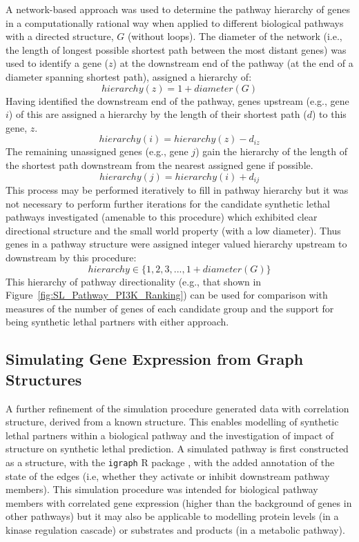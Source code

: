 A network-based approach was used to determine the pathway hierarchy of genes in a computationally rational way when applied to different biological pathways with a directed  structure, $G$ (without loops). The diameter of the network (i.e., the length of longest possible \gls{shortest path} between the most distant genes) was used to identify a gene ($z$) at the downstream end of the pathway (at the end of a diameter spanning \gls{shortest path}), assigned a hierarchy of: $$hierarchy(z) = 1 + diameter(G)$$ Having identified the downstream end of the pathway, genes upstream (e.g., gene $i$) of this are assigned a hierarchy by the length of their \gls{shortest path} ($d$) to this gene, $z$. $$hierarchy(i) = hierarchy(z) - d_{iz}$$ The remaining unassigned genes (e.g., gene $j$) gain the hierarchy of the length of the \gls{shortest path} downstream from the nearest assigned gene if possible. $$hierarchy(j) = hierarchy(i) + d_{ij}$$ This process may be performed iteratively to fill in pathway hierarchy but it was not necessary to perform further iterations for the candidate \gls{synthetic lethal} pathways investigated (amenable to this procedure) which exhibited clear directional structure and the \gls{small world} property (with a low diameter). Thus genes in a pathway  structure were assigned integer valued hierarchy upstream to downstream by this procedure: $$hierarchy \in \{1, 2, 3, ..., 1 + diameter(G)\}$$
This hierarchy of pathway directionality (e.g.,  that shown in Figure~\ref{fig:SL_Pathway_PI3K_Ranking}) can be used for comparison with measures of the number of genes of each candidate group and the support for being \gls{synthetic lethal} partners with either approach.

\subsection{Simulating Gene Expression from Graph Structures} \label{methods:graphsim}
A further refinement of the simulation procedure generated  data with correlation structure, derived from a known  structure. %
This enables modelling of \gls{synthetic lethal} partners within a biological pathway and the investigation of impact of  structure on \gls{synthetic lethal} prediction. A simulated pathway is first constructed as a  structure, with the \texttt{igraph} R package \citet{igraph}, with the added annotation of the state of the \glspl{edge} (i.e, whether they activate or inhibit downstream pathway members). This simulation procedure was intended for biological pathway members with correlated \gls{gene expression} (higher than the background of genes in other pathways) but it may also be applicable to modelling protein levels (in a kinase regulation cascade) or substrates and products (in a metabolic pathway).%

